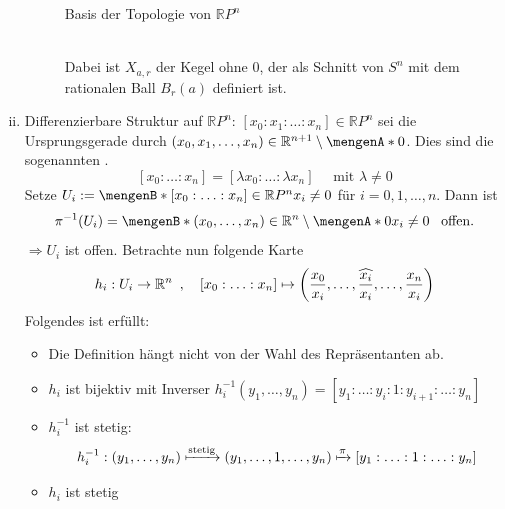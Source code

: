 \begin{enumerate}[(i)]
\begin{description}
\begin{minipage}{\textwidth}
{
			\caption{Basis der Topologie von $\mathds{R}P^n$}
			}
		\end{minipage} \smallskip \\
		Dabei ist $X_{a,r}$ der Kegel ohne $0$, der als Schnitt von $S^n$ mit dem rationalen Ball $B_r(a)$ definiert ist.
	\end{description}
	\item Differenzierbare Struktur auf $\mathds{R}P^n$: $[x_0 : x_1 : \ldots : x_n] \in \mathds{R}P^n$ sei die Ursprungsgerade durch $(x_0, x_1, \ldots , x_n) \in
	\mathds{R}^{n+1} \setminus \set{0}$. Dies sind die sogenannten .
	\[
		[x_0 : \ldots : x_n] = [\lambda x_0 : \ldots : \lambda x_n] \quad \text{ mit } \lambda \not= 0
	\]
	Setze $U_i := \set[{[x_0 : \ldots : x_n] \in \mathds{R}P^n}]{x_i \not= 0} $ für $i=0,1,\ldots ,n$. Dann ist
	\[
		\pi  ^{-1} (U_i) = \set[(x_0, \ldots , x_n) \in \mathds{R}^n \setminus \set{0} ]{x_i \not= 0}  \enspace\text{ offen.}
	\]
	$\Rightarrow U_i$ ist offen. Betrachte nun folgende Karte
	\[
		h_i : U_i \to \mathds{R}^n \enspace, \quad [x_0 : \ldots : x_n] \mapsto \enbrace*{ \frac{x_0}{x_i}, \ldots , \widehat{\frac{x_i}{x_i}}, \ldots , \frac{x_n}{x_i}   } 
	\]
	Folgendes ist erfüllt:
	\begin{itemize}
		\item Die Definition hängt nicht von der Wahl des Repräsentanten ab.
		\item $h_i$ ist bijektiv mit Inverser $h_i ^{-1} (y_1, \ldots , y_n) = [y_1 : \ldots  : y_i : 1 : y_{i+1} : \ldots : y_n]$
		\item $h_i ^{-1}$ ist stetig: 
		\[
			h_i ^{-1} : (y_1, \ldots , y_n) \xmapsto{\text{stetig}} (y_1, \ldots ,1, \ldots , y_n) \xmapsto{\pi } [y_1 : \ldots : 1 : \ldots : y_n]
		\]
		\item $h_i$ ist stetig

\end{itemize}
\end{enumerate}
